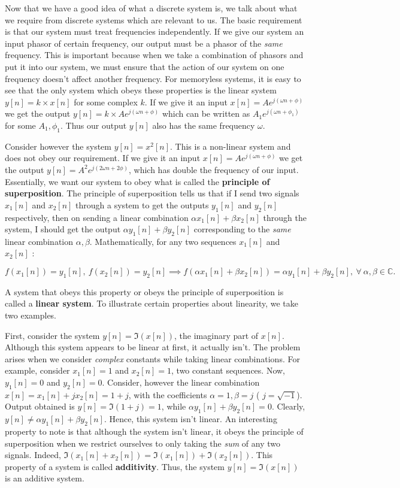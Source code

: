 \documentclass{article}
\theoremstyle{definition}
\begin{document}
Now that we have a good idea of what a discrete system is, we talk about what we require from discrete systems which are relevant to us. The basic requirement is that our system must treat frequencies independently. If we give our system an input phasor of certain frequency, our output must be a phasor of the \textit{same} frequency. This is important because when we take a combination of phasors and put it into our system, we must ensure that the action of our system on one frequency doesn't affect another frequency. For memoryless systems, it is easy to see that the only system which obeys these properties is the linear system $y[n] = k\times x[n]$ for some complex $k$. If we give it an input $x[n] = Ae^{j(\omega n + \phi)}$ we get the output $y[n] = k\times Ae^{j(\omega n + \phi)}$ which can be written as $A_1 e^{j(\omega n + \phi_1)}$ for some $A_1 , \phi_1$. Thus our output $y[n]$ also has the same frequency $\omega$. \smallskip

Consider however the system $y[n] = x^2[n]$. This is a non-linear system and does not obey our requirement. If we give it an input $x[n] = Ae^{j(\omega n + \phi)}$ we get the output $y[n] = A^2 e^{j(2\omega n + 2\phi)}$, which has double the frequency of our input. Essentially, we want our system to obey what is called the \textbf{principle of superposition}. The principle of superposition tells us that if I send two signals $x_1[n]$ and $x_2[n]$ through a system to get the outputs $y_1[n]$ and $y_2[n]$ respectively, then on sending a linear combination $\alpha x_1[n] + \beta x_2[n]$ through the system, I should get the output $\alpha y_1[n] + \beta y_2[n]$ corresponding to the \textit{same} linear combination $\alpha, \beta$. Mathematically, for any two sequences $x_1[n]$ and $x_2[n]$ :

\[
	f(x_1[n]) = y_1[n] , \: f(x_2[n]) = y_2[n] \implies f(\alpha x_1[n] + \beta x_2[n]) = \alpha y_1[n] + \beta y_2[n] , \: \forall \: \alpha, \beta \in \mathbb{C}.
\]

A system that obeys this property or obeys the principle of superposition is called a \textbf{linear system}. To illustrate certain properties about linearity, we take two examples. \smallskip

First, consider the system $y[n] = \Im(x[n])$, the imaginary part of $x[n]$. Although this system appears to be linear at first, it actually isn't. The problem arises when we consider \textit{complex} constants while taking linear combinations. For example, consider $x_1[n] = 1$ and $x_2[n] = 1$, two constant sequences. Now, $y_1[n] = 0$ and $y_2[n] = 0$. Consider, however the linear combination $x[n] = x_1[n] + jx_2[n] = 1 + j$, with the coefficients $\alpha = 1, \beta = j$ ( $j = \sqrt{-1}$). Output obtained is $y[n] = \Im(1+j) = 1$, while $\alpha y_1[n] + \beta y_2[n] = 0$. Clearly, $y[n] \neq \alpha y_1[n] + \beta y_2[n]$. Hence, this system isn't linear. An interesting property to note is that although the system isn't linear, it obeys the principle of superposition when we restrict ourselves to only taking the \textit{sum} of any two signals. Indeed, $\Im(x_1[n] + x_2[n]) = \Im(x_1[n]) + \Im(x_2[n])$. This property of a system is called \textbf{additivity}. Thus, the system $y[n] = \Im(x[n])$ is an additive system. \smallskip
\end{document}
